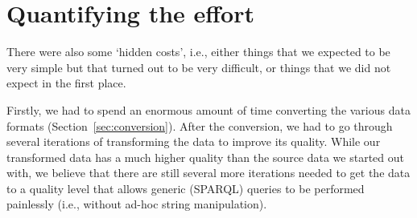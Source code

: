 \documentclass[a4paper]{scrartcl}
\begin{document}

\section{Quantifying the effort}

There were also some `hidden costs', i.e., either things that we
expected to be very simple but that turned out to be very difficult,
or things that we did not expect in the first place.

Firstly, we had to spend an enormous amount of time converting the
various data formats (Section~\ref{sec:conversion}).  After the
conversion, we had to go through several iterations of transforming
the data to improve its quality.  While our transformed data has a
much higher quality than the source data we started out with, we
believe that there are still several more iterations needed to get the
data to a quality level that allows generic (SPARQL) queries to be
performed painlessly (i.e., without ad-hoc string manipulation).
\end{document}
